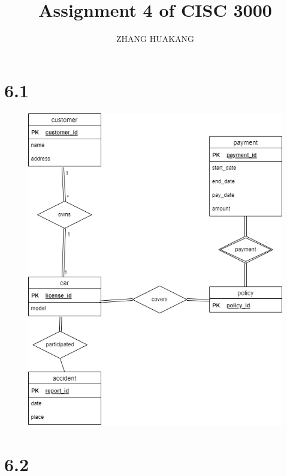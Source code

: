 \documentclass{article}
\title{Assignment 4 of CISC 3000}
\author{ZHANG HUAKANG}
\begin{document}
    \maketitle
    \section*{6.1}
    \begin{figure}[H]
        \centering
        \includegraphics[width=\textwidth]{img/51.png}
    \end{figure}

    \section*{6.2}
\end{document}
